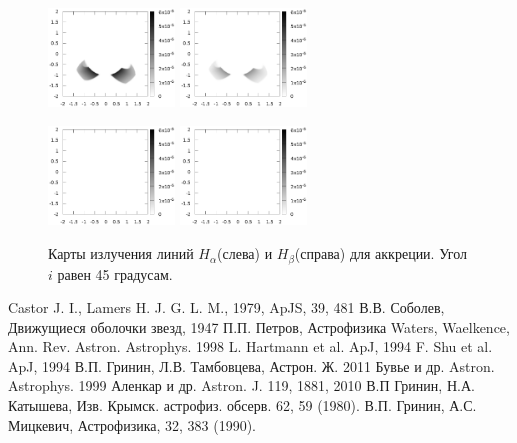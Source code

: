 \documentclass{article}
\begin{document}
\begin{figure}
	\includegraphics[width=0.3\textwidth]{map1Ha3accr453045}
	\includegraphics[width=0.3\textwidth]{map1Hb3accr453045}
	
	\includegraphics[width=0.3\textwidth]{map2Ha3accr453045}
	\includegraphics[width=0.3\textwidth]{map2Hb3accr453045}
	\caption{Карты излучения линий $H_\alpha$(слева) и $H_\beta$(справа) для аккреции. Угол $i$ равен 45 градусам.}
\end{figure}
\newpage


\begin{thebibliography}{99}
 Castor J. I., Lamers H. J. G. L. M., 1979, ApJS, 39, 481
 В.В. Соболев, Движущиеся оболочки звезд, 1947
 П.П. Петров, Астрофизика
 Waters, Waelkence, Ann. Rev. Astron. Astrophys. 1998 
 L. Hartmann et al. ApJ, 1994
 F. Shu et al. ApJ, 1994
 В.П. Гринин, Л.В. Тамбовцева, Астрон. Ж. 2011
 Бувье и др. Astron. Astrophys. 1999
 Аленкар и др. Astron. J. 119, 1881, 2010
 В.П Гринин, Н.А. Катышева, Изв. Крымск. астрофиз. обсерв. 62, 59 (1980).
 В.П. Гринин, А.С. Мицкевич, Астрофизика, 32, 383 (1990).

\end{thebibliography}
\end{document}
